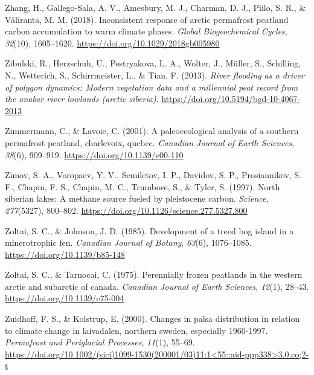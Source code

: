 \documentclass[]{article}
\begin{document}
\leavevmode\hypertarget{ref-Zhang_2018}{}%
Zhang, H., Gallego-Sala, A. V., Amesbury, M. J., Charman, D. J., Piilo,
S. R., \& Väliranta, M. M. (2018). Inconsistent response of arctic
permafrost peatland carbon accumulation to warm climate phases.
\emph{Global Biogeochemical Cycles}, \emph{32}(10), 1605--1620.
\url{https://doi.org/10.1029/2018gb005980}

\leavevmode\hypertarget{ref-Zibulski_2013}{}%
Zibulski, R., Herzschuh, U., Pestryakova, L. A., Wolter, J., Müller, S.,
Schilling, N., Wetterich, S., Schirrmeister, L., \& Tian, F. (2013).
\emph{River flooding as a driver of polygon dynamics: Modern vegetation
data and a millennial peat record from the anabar river lowlands (arctic
siberia)}. \url{https://doi.org/10.5194/bgd-10-4067-2013}

\leavevmode\hypertarget{ref-Zimmermann_2001}{}%
Zimmermann, C., \& Lavoie, C. (2001). A paleoecological analysis of a
southern permafrost peatland, charlevoix, quebec. \emph{Canadian Journal
of Earth Sciences}, \emph{38}(6), 909--919.
\url{https://doi.org/10.1139/e00-110}

\leavevmode\hypertarget{ref-Zimov_1997}{}%
Zimov, S. A., Voropaev, Y. V., Semiletov, I. P., Davidov, S. P.,
Prosiannikov, S. F., Chapin, F. S., Chapin, M. C., Trumbore, S., \&
Tyler, S. (1997). North siberian lakes: A methane source fueled by
pleistocene carbon. \emph{Science}, \emph{277}(5327), 800--802.
\url{https://doi.org/10.1126/science.277.5327.800}

\leavevmode\hypertarget{ref-Zoltai_1985}{}%
Zoltai, S. C., \& Johnson, J. D. (1985). Development of a treed bog
island in a minerotrophic fen. \emph{Canadian Journal of Botany},
\emph{63}(6), 1076--1085. \url{https://doi.org/10.1139/b85-148}

\leavevmode\hypertarget{ref-Zoltai_1975}{}%
Zoltai, S. C., \& Tarnocai, C. (1975). Perennially frozen peatlands in
the western arctic and subarctic of canada. \emph{Canadian Journal of
Earth Sciences}, \emph{12}(1), 28--43.
\url{https://doi.org/10.1139/e75-004}

\leavevmode\hypertarget{ref-Zuidhoff_2000}{}%
Zuidhoff, F. S., \& Kolstrup, E. (2000). Changes in palsa distribution
in relation to climate change in laivadalen, northern sweden, especially
1960-1997. \emph{Permafrost and Periglacial Processes}, \emph{11}(1),
55--69.
\href{https://doi.org/10.1002/(sici)1099-1530(200001/03)11:1\%3C55::aid-ppp338\%3E3.0.co;2-t}{https://doi.org/10.1002/(sici)1099-1530(200001/03)11:1\textless{}55::aid-ppp338\textgreater{}3.0.co;2-t}
\end{document}
